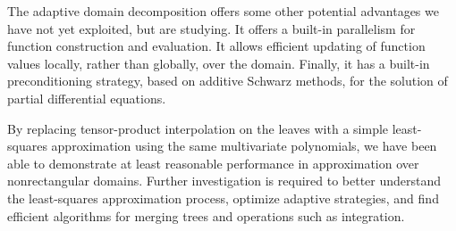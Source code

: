 The adaptive domain decomposition offers some other potential advantages we have not yet exploited, but are studying. It offers a built-in parallelism for function construction and evaluation. It allows efficient updating of function values locally, rather than globally, over the domain. Finally, it has a built-in preconditioning strategy, based on additive Schwarz methods, for the solution of partial differential equations.

By replacing tensor-product interpolation on the leaves with a simple least-squares approximation using the same multivariate polynomials, we have been able to demonstrate at least reasonable performance in approximation over nonrectangular domains. Further investigation is required to better understand the least-squares approximation process, optimize adaptive strategies, and find efficient algorithms for merging trees and operations such as integration.